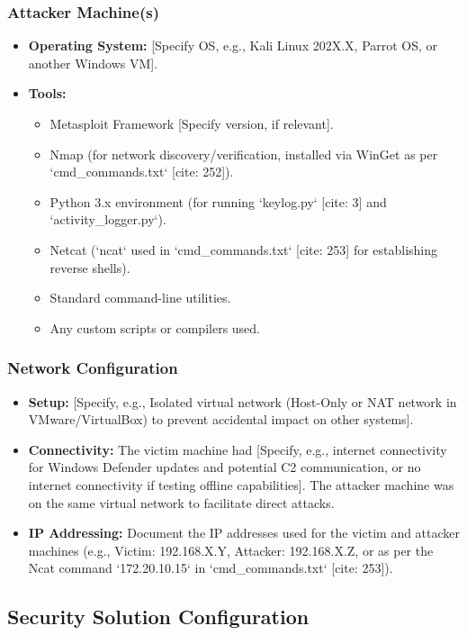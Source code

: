 \documentclass[11pt]{article}
\begin{document}
	\subsubsection{Attacker Machine(s)}
	\begin{itemize}
		\item \textbf{Operating System:} [Specify OS, e.g., Kali Linux 202X.X, Parrot OS, or another Windows VM].
		\item \textbf{Tools:}
		\begin{itemize}
			\item Metasploit Framework [Specify version, if relevant].
			\item Nmap (for network discovery/verification, installed via WinGet as per `cmd_commands.txt` [cite: 252]).
			\item Python 3.x environment (for running `keylog.py` [cite: 3] and `activity_logger.py`).
			\item Netcat (`ncat` used in `cmd_commands.txt` [cite: 253] for establishing reverse shells).
			\item Standard command-line utilities.
			\item Any custom scripts or compilers used.
		\end{itemize}
	\end{itemize}
	
	\subsubsection{Network Configuration}
	\begin{itemize}
		\item \textbf{Setup:} [Specify, e.g., Isolated virtual network (Host-Only or NAT network in VMware/VirtualBox) to prevent accidental impact on other systems].
		\item \textbf{Connectivity:} The victim machine had [Specify, e.g., internet connectivity for Windows Defender updates and potential C2 communication, or no internet connectivity if testing offline capabilities]. The attacker machine was on the same virtual network to facilitate direct attacks.
		\item \textbf{IP Addressing:} Document the IP addresses used for the victim and attacker machines (e.g., Victim: 192.168.X.Y, Attacker: 192.168.X.Z, or as per the Ncat command `172.20.10.15` in `cmd_commands.txt` [cite: 253]).
	\end{itemize}
	
	\subsection{Security Solution Configuration}
\end{document}
